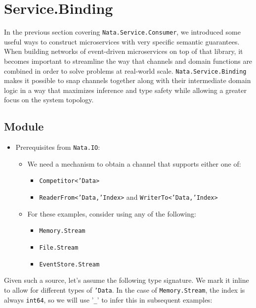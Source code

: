 \documentclass{article}
\begin{document}
\clearpage
\section{Service.Binding}

In the previous section covering \texttt{Nata.Service.Consumer}, we introduced some useful ways to construct microservices with very specific semantic guarantees.  When building networks of event-driven microservices on top of that library, it becomes important to streamline the way that channels and domain functions are combined in order to solve problems at real-world scale.  \texttt{Nata.Service.Binding} makes it possible to snap channels together along with their intermediate domain logic in a way that maximizes inference and type safety while allowing a greater focus on the system topology.

\subsection{Module}

\begin{itemize}
    \item Prerequisites from \texttt{Nata.IO}:
    \begin{itemize}
        \item We need a mechanism to obtain a channel that supports either one of:
        \begin{itemize}
            \item \texttt{Competitor<'Data>}
            \item \texttt{ReaderFrom<'Data,'Index>} and \texttt{WriterTo<'Data,'Index>}
        \end{itemize}
        \item For these examples, consider using any of the following:
        \begin{itemize}
            \item \texttt{Memory.Stream}
            \item \texttt{File.Stream}
            \item \texttt{EventStore.Stream}
        \end{itemize}
    \end{itemize}
\end{itemize}

Given such a source, let's assume the following type signature.  We mark it inline to allow for different types of  \texttt{'Data}.  In the case of \texttt{Memory.Stream}, the index is always \texttt{int64}, so we will use '\texttt{_}' to infer this in subsequent examples:
\end{document}

